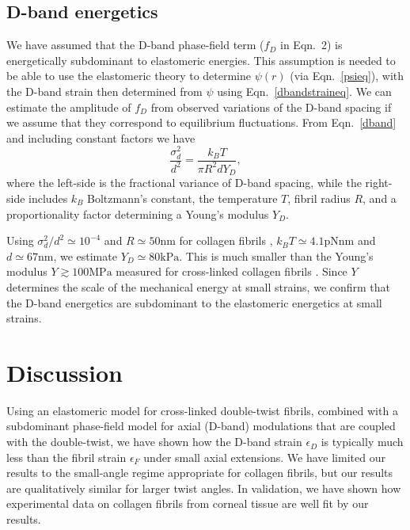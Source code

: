 \documentclass[preprint,12pt]{elsarticle}
\begin{document}
\subsection{D-band energetics}
We have assumed that the D-band phase-field term ($f_D$ in Eqn.~2) is energetically subdominant to elastomeric energies. This assumption is needed to be able to use the elastomeric theory to determine $\psi(r)$ (via Eqn.~\ref{psieq}), with the D-band strain then determined from $\psi$ using Eqn.~\ref{dbandstraineq}. We can estimate the amplitude of $f_D$ from observed variations of the D-band spacing if we assume that they correspond to equilibrium fluctuations. From Eqn.~\ref{dband} and including constant factors we have \cite{Cameron:2020}
\begin{equation}
    \frac{\sigma^2_d}{d^2} = \frac{k_B T}{\pi R^2 d Y_D},
\end{equation}
where the left-side is the fractional variance of D-band spacing, while the right-side includes $k_B$ Boltzmann's constant, the temperature $T$, fibril radius $R$, and a proportionality factor determining a Young's modulus $Y_D$. 

Using $\sigma^2_d/d^2 \simeq 10^{-4}$ and $R \simeq 50\mathrm{nm}$ for collagen fibrils \cite{Fang:2012,Fang:2013B}, $k_B T \simeq 4.1 \mathrm{pN nm}$ and $d \simeq 67\mathrm{nm}$, we estimate $Y_D \simeq 80 \mathrm{kPa}$. This is much smaller than the Young's modulus $Y \gtrsim 100\mathrm{MPa}$ measured for cross-linked collagen fibrils \cite{Graham:2004}. Since $Y$ determines the scale of the mechanical energy at small strains, we confirm that the D-band energetics are subdominant to the elastomeric energetics at small strains. 

\section{Discussion}
\label{sec:discussion}
Using an elastomeric model for cross-linked double-twist fibrils, combined with a subdominant phase-field model for axial (D-band) modulations that are coupled with the double-twist, we have shown how the D-band strain $\epsilon_D$ is typically much less than the fibril strain $\epsilon_F$ under small axial extensions. We have limited our results to the small-angle regime appropriate for collagen fibrils, but our results are qualitatively similar for larger twist angles. In validation, we have shown how experimental data on collagen fibrils from corneal tissue are well fit by our results. 
\end{document}
